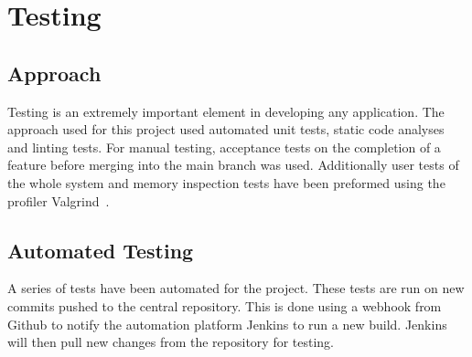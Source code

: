 \chapter{Testing}






\section{Approach}
Testing is an extremely important element in developing any application. The approach used for this project used automated unit tests, static code analyses and linting tests. For manual testing, acceptance tests on the completion of a feature before merging into the main branch was used. Additionally user tests of the whole system and memory inspection tests have been preformed using the profiler Valgrind~\cite{valgrind}.

\section{Automated Testing}
A series of tests have been automated for the project. These tests are run on new commits pushed to the central repository. This is done using a webhook from Github to notify the automation platform Jenkins to run a new build. Jenkins will then pull new changes from the repository for testing. 


